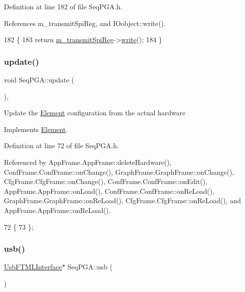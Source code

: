 Definition at line 182 of file Seq\+P\+G\+A.\+h.



References m\+\_\+transmit\+Spi\+Reg, and I\+Oobject\+::write().


\begin{DoxyCode}
182                            \{
183     \textcolor{keywordflow}{return} \hyperlink{classSeqPGA_a4e0ffb37b1cd947d389354ac25723ab8}{m\_transmitSpiReg}->\hyperlink{classIOobject_a9f6984bc9f0fadcf800f1be2523ac744}{write}();
184   \}
\end{DoxyCode}
\mbox{\label{classSeqPGA_a0003d286a27a82024d84b392edab2c3b}} 
\subsubsection{\texorpdfstring{update()}{update()}}
{\footnotesize\ttfamily void Seq\+P\+G\+A\+::update (\begin{DoxyParamCaption}{ }\end{DoxyParamCaption})\hspace{0.3cm}{\ttfamily [inline]}, {\ttfamily [virtual]}}

Update the \hyperlink{classElement}{Element} configuration from the actual hardware 

Implements \hyperlink{classElement_a4e6c83efae95616ebddd03c793a26661}{Element}.



Definition at line 72 of file Seq\+P\+G\+A.\+h.



Referenced by App\+Frame.\+App\+Frame\+::delete\+Hardware(), Conf\+Frame.\+Conf\+Frame\+::on\+Change(), Graph\+Frame.\+Graph\+Frame\+::on\+Change(), Cfg\+Frame.\+Cfg\+Frame\+::on\+Change(), Conf\+Frame.\+Conf\+Frame\+::on\+Edit(), App\+Frame.\+App\+Frame\+::on\+Load(), Conf\+Frame.\+Conf\+Frame\+::on\+Re\+Load(), Graph\+Frame.\+Graph\+Frame\+::on\+Re\+Load(), Cfg\+Frame.\+Cfg\+Frame\+::on\+Re\+Load(), and App\+Frame.\+App\+Frame\+::on\+Re\+Load().


\begin{DoxyCode}
72                  \{
73   \};
\end{DoxyCode}
\mbox{\label{classSeqPGA_a10c68ea9de38eb0445d47e4b21b580a1}} 
\subsubsection{\texorpdfstring{usb()}{usb()}}
{\footnotesize\ttfamily \hyperlink{classUsbFTMLInterface}{Usb\+F\+T\+M\+L\+Interface}$\ast$ Seq\+P\+G\+A\+::usb (\begin{DoxyParamCaption}{ }\end{DoxyParamCaption})\hspace{0.3cm}{\ttfamily [inline]}}



